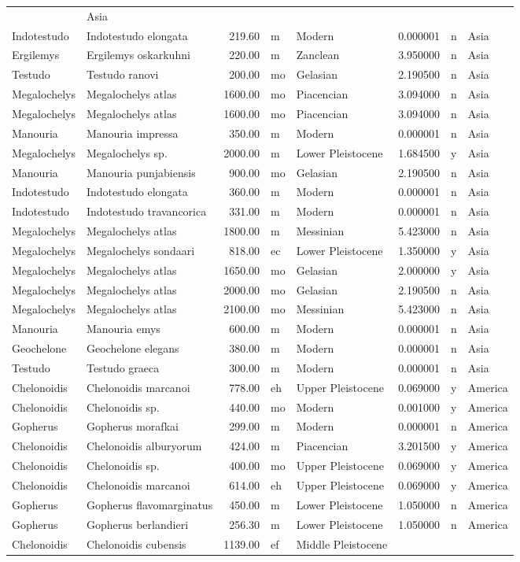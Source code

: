 \documentclass[]{article}
\begin{document}
\begin{longtable}[]{@{}llrllrll@{}}
& Asia\tabularnewline
Indotestudo & Indotestudo elongata & 219.60 & m & Modern & 0.000001 & n
& Asia\tabularnewline
Ergilemys & Ergilemys oskarkuhni & 220.00 & m & Zanclean & 3.950000 & n
& Asia\tabularnewline
Testudo & Testudo ranovi & 200.00 & mo & Gelasian & 2.190500 & n &
Asia\tabularnewline
Megalochelys & Megalochelys atlas & 1600.00 & mo & Piacencian & 3.094000
& n & Asia\tabularnewline
Megalochelys & Megalochelys atlas & 1600.00 & mo & Piacencian & 3.094000
& n & Asia\tabularnewline
Manouria & Manouria impressa & 350.00 & m & Modern & 0.000001 & n &
Asia\tabularnewline
Megalochelys & Megalochelys sp. & 2000.00 & m & Lower Pleistocene &
1.684500 & y & Asia\tabularnewline
Manouria & Manouria punjabiensis & 900.00 & mo & Gelasian & 2.190500 & n
& Asia\tabularnewline
Indotestudo & Indotestudo elongata & 360.00 & m & Modern & 0.000001 & n
& Asia\tabularnewline
Indotestudo & Indotestudo travancorica & 331.00 & m & Modern & 0.000001
& n & Asia\tabularnewline
Megalochelys & Megalochelys atlas & 1800.00 & m & Messinian & 5.423000 &
n & Asia\tabularnewline
Megalochelys & Megalochelys sondaari & 818.00 & ec & Lower Pleistocene &
1.350000 & y & Asia\tabularnewline
Megalochelys & Megalochelys atlas & 1650.00 & mo & Gelasian & 2.000000 &
y & Asia\tabularnewline
Megalochelys & Megalochelys atlas & 2000.00 & mo & Gelasian & 2.190500 &
n & Asia\tabularnewline
Megalochelys & Megalochelys atlas & 2100.00 & mo & Messinian & 5.423000
& n & Asia\tabularnewline
Manouria & Manouria emys & 600.00 & m & Modern & 0.000001 & n &
Asia\tabularnewline
Geochelone & Geochelone elegans & 380.00 & m & Modern & 0.000001 & n &
Asia\tabularnewline
Testudo & Testudo graeca & 300.00 & m & Modern & 0.000001 & n &
Asia\tabularnewline
Chelonoidis & Chelonoidis marcanoi & 778.00 & eh & Upper Pleistocene &
0.069000 & y & America\tabularnewline
Chelonoidis & Chelonoidis sp. & 440.00 & mo & Modern & 0.001000 & y &
America\tabularnewline
Gopherus & Gopherus morafkai & 299.00 & m & Modern & 0.000001 & n &
America\tabularnewline
Chelonoidis & Chelonoidis alburyorum & 424.00 & m & Piacencian &
3.201500 & y & America\tabularnewline
Chelonoidis & Chelonoidis sp. & 400.00 & mo & Upper Pleistocene &
0.069000 & y & America\tabularnewline
Chelonoidis & Chelonoidis marcanoi & 614.00 & eh & Upper Pleistocene &
0.069000 & y & America\tabularnewline
Gopherus & Gopherus flavomarginatus & 450.00 & m & Lower Pleistocene &
1.050000 & n & America\tabularnewline
Gopherus & Gopherus berlandieri & 256.30 & m & Lower Pleistocene &
1.050000 & n & America\tabularnewline
Chelonoidis & Chelonoidis cubensis & 1139.00 & ef & Middle Pleistocene &

\end{longtable}
\end{document}
